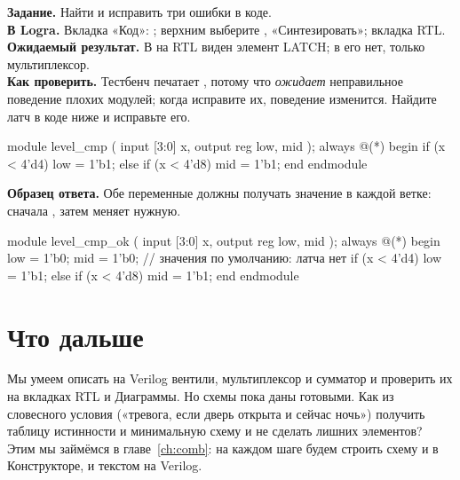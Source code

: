 \begin{diybox}
\textbf{Задание.} Найти и исправить три ошибки в коде.\\
\textbf{В Logra.} Вкладка «Код»: ; верхним выберите
, «Синтезировать»; вкладка RTL.\\
\textbf{Ожидаемый результат.} В  на RTL виден элемент LATCH;
в  его нет, только мультиплексор.\\
\textbf{Как проверить.} Тестбенч  печатает
, потому что \emph{ожидает} неправильное поведение плохих
модулей; когда исправите их, поведение изменится.  Найдите
латч в коде ниже и исправьте его.
\end{diybox}

\begin{vcode}
module level_cmp (
    input      [3:0] x,
    output reg       low, mid
);
    always @(*) begin
        if (x < 4'd4)       low = 1'b1;
        else if (x < 4'd8)  mid = 1'b1;
    end
endmodule
\end{vcode}
\textbf{Образец ответа.} Обе переменные должны получать значение в каждой
ветке: сначала , затем  меняет нужную.
\begin{vcode}
module level_cmp_ok (
    input      [3:0] x,
    output reg       low, mid
);
    always @(*) begin
        low = 1'b0;
        mid = 1'b0;                  // значения по умолчанию: латча нет
        if (x < 4'd4)       low = 1'b1;
        else if (x < 4'd8)  mid = 1'b1;
    end
endmodule
\end{vcode}


\section{Что дальше}

Мы умеем описать на Verilog вентили, мультиплексор и сумматор и проверить их на
вкладках RTL и Диаграммы. Но схемы пока даны готовыми. Как из словесного условия
(«тревога, если дверь открыта и сейчас ночь») получить таблицу истинности и
минимальную схему и не сделать лишних элементов? Этим мы займёмся в
главе~\ref{ch:comb}: на каждом шаге будем строить схему и в Конструкторе, и
текстом на Verilog.
